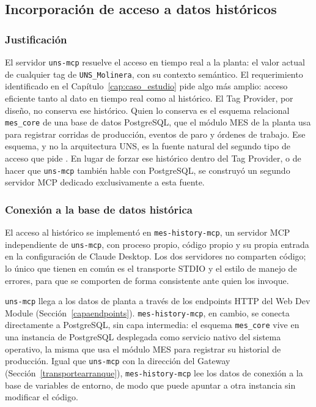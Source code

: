 \subsection{Incorporación de acceso a datos históricos}
\label{accesodatoshistoricos}

\subsubsection{Justificación}
\label{justificacionhistorico}

El servidor \texttt{uns-mcp} resuelve el acceso en tiempo real a la planta: el valor actual de
cualquier tag de \texttt{UNS\_Molinera}, con su contexto semántico. El requerimiento 
identificado en el Capítulo~\ref{cap:caso_estudio} pide algo más amplio: acceso eficiente
tanto al dato en tiempo real como al histórico. El Tag Provider, por diseño, no conserva ese
histórico. Quien lo conserva es el esquema relacional \texttt{mes\_core} de una base de datos
PostgreSQL, que el módulo MES de la planta usa para registrar corridas de producción, eventos
de paro y órdenes de trabajo. Ese esquema, y no la arquitectura UNS, es la fuente natural del
segundo tipo de acceso que pide . En lugar de forzar ese histórico dentro del Tag Provider, o de hacer que \texttt{uns-mcp}
también hable con PostgreSQL, se construyó un segundo servidor MCP dedicado exclusivamente a
esta fuente.

\subsubsection{Conexión a la base de datos histórica}
\label{conexionbdhistorica}

El acceso al histórico se implementó en \texttt{mes-history-mcp}, un servidor MCP
independiente de \texttt{uns-mcp}, con proceso propio, código propio y su propia entrada en la
configuración de Claude Desktop. Los dos servidores no comparten código; lo único que tienen
en común es el transporte STDIO y el estilo de manejo de errores, para que se comporten de
forma consistente ante quien los invoque.

\texttt{uns-mcp} llega a los datos de planta a través de los endpoints HTTP del Web Dev Module
(Sección~\ref{capaendpoints}). \texttt{mes-history-mcp}, en cambio, se conecta directamente a
PostgreSQL, sin capa intermedia: el esquema \texttt{mes\_core} vive en una instancia de
PostgreSQL desplegada como servicio nativo del sistema operativo, la misma que usa el módulo
MES para registrar su historial de producción. Igual que \texttt{uns-mcp} con la dirección del
Gateway (Sección~\ref{transportearranque}), \texttt{mes-history-mcp} lee los datos de conexión
a la base de variables de entorno, de modo que puede apuntar a otra instancia sin modificar el
código.

